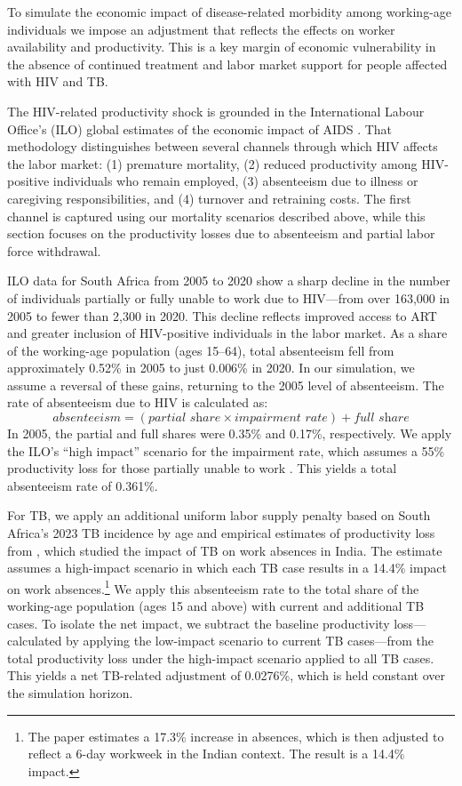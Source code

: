 \documentclass[letterpaper,12pt]{article}
\theoremstyle{definition}
\begin{document}
\begin{spacing}{1.5}
To simulate the economic impact of disease-related morbidity among working-age individuals we impose an adjustment that reflects the effects on worker availability and productivity. This is a key margin of economic vulnerability in the absence of continued treatment and labor market support for people affected with HIV and TB.

The HIV-related productivity shock is grounded in the International Labour Office's (ILO) global estimates of the economic impact of AIDS \citep{ILO2018}. That methodology distinguishes between several channels through which HIV affects the labor market: (1) premature mortality, (2) reduced productivity among HIV-positive individuals who remain employed, (3) absenteeism due to illness or caregiving responsibilities, and (4) turnover and retraining costs. The first channel is captured using our mortality scenarios described above, while this section focuses on the productivity losses due to absenteeism and partial labor force withdrawal.

ILO data for South Africa from 2005 to 2020 show a sharp decline in the number of individuals partially or fully unable to work due to HIV---from over 163,000 in 2005 to fewer than 2,300 in 2020. This decline reflects improved access to ART and greater inclusion of HIV-positive individuals in the labor market. As a share of the working-age population (ages 15--64), total absenteeism fell from approximately \num{0.52}\% in 2005 to just \num{0.006}\% in 2020. In our simulation, we assume a reversal of these gains, returning to the 2005 level of absenteeism. The rate of absenteeism due to HIV is calculated as:
\[
\textit{absenteeism} = (\textit{partial share} \times \textit{impairment rate}) + \textit{full share}
\]
In 2005, the partial and full shares were \num{0.35}\% and \num{0.17}\%, respectively. We apply the ILO’s ``high impact'' scenario for the impairment rate, which assumes a 55\% productivity loss for those partially unable to work \citep{ILO2018}. This yields a total absenteeism rate of \num{0.361}\%.

For TB, we apply an additional uniform labor supply penalty based on South Africa's 2023 TB incidence by age and empirical estimates of productivity loss from \citet{Keogh2024}, which studied the impact of TB on work absences in India. The estimate assumes a high-impact scenario in which each TB case results in a \num{14.4}\% impact on work absences.\footnote{The paper estimates a \num{17.3}\% increase in absences, which is then adjusted to reflect a 6-day workweek in the Indian context. The result is a \num{14.4}\% impact.} We apply this absenteeism rate to the total share of the working-age population (ages 15 and above) with current and additional TB cases. To isolate the net impact, we subtract the baseline productivity loss—calculated by applying the low-impact scenario to current TB cases—from the total productivity loss under the high-impact scenario applied to all TB cases. This yields a net TB-related adjustment of \num{0.0276}\%, which is held constant over the simulation horizon.


\end{spacing}
\end{document}
